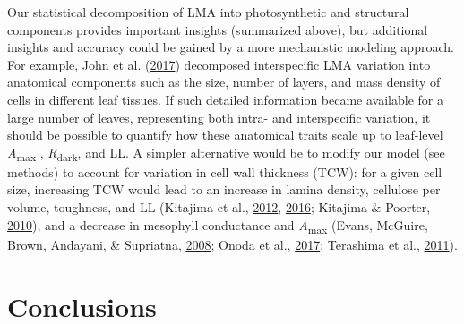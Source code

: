 \documentclass[12pt,]{article}
\theoremstyle{definition}
\theoremstyle{definition}
\theoremstyle{definition}
\theoremstyle{remark}
\begin{document}
Our statistical decomposition of LMA into photosynthetic and structural
components provides important insights (summarized above), but
additional insights and accuracy could be gained by a more mechanistic
modeling approach. For example, John et al.
(\protect\hyperlink{ref-John2017}{2017}) decomposed interspecific LMA
variation into anatomical components such as the size, number of layers,
and mass density of cells in different leaf tissues. If such detailed
information became available for a large number of leaves, representing
both intra- and interspecific variation, it should be possible to
quantify how these anatomical traits scale up to leaf-level
\emph{A}\textsubscript{max} , \emph{R}\textsubscript{dark}, and LL. A
simpler alternative would be to modify our model (see methods) to
account for variation in cell wall thickness (TCW): for a given cell
size, increasing TCW would lead to an increase in lamina density,
cellulose per volume, toughness, and LL (Kitajima et al.,
\protect\hyperlink{ref-Kitajima2012}{2012},
\protect\hyperlink{ref-Kitajima2016}{2016}; Kitajima \& Poorter,
\protect\hyperlink{ref-Kitajima2010}{2010}), and a decrease in mesophyll
conductance and \emph{A}\textsubscript{max} (Evans, McGuire, Brown,
Andayani, \& Supriatna, \protect\hyperlink{ref-Evans2008}{2008}; Onoda
et al., \protect\hyperlink{ref-Onoda2017}{2017}; Terashima et al.,
\protect\hyperlink{ref-Terashima2011}{2011}).

\hypertarget{conclusions}{%
\section{Conclusions}\label{conclusions}}
\end{document}
